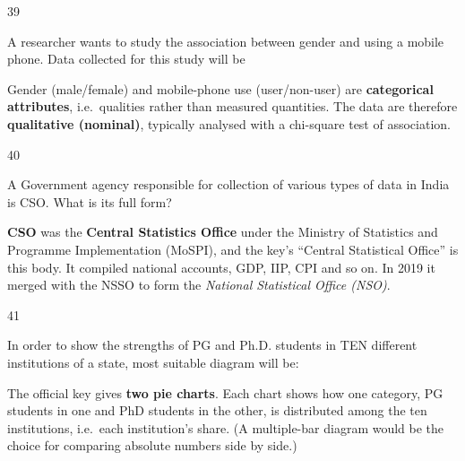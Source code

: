 \begin{question}{39}
{A researcher wants to study the association between gender and using a mobile phone. Data collected for this study will be \blank{}\par}
\begin{explain}
Gender (male/female) and mobile-phone use (user/non-user) are \textbf{categorical attributes}, i.e.\ qualities rather than measured quantities. The data are therefore \textbf{qualitative (nominal)}, typically analysed with a chi-square test of association.
\end{explain}
\end{question}

\begin{question}{40}
{A Government agency responsible for collection of various types of data in India is CSO. What is its full form?\par}
\begin{explain}
\textbf{CSO} was the \textbf{Central Statistics Office} under the Ministry of Statistics and Programme Implementation (MoSPI), and the key's ``Central Statistical Office'' is this body. It compiled national accounts, GDP, IIP, CPI and so on. In 2019 it merged with the NSSO to form the \emph{National Statistical Office (NSO)}.
\end{explain}
\end{question}

\begin{question}{41}
{In order to show the strengths of PG and Ph.D. students in TEN different institutions of a state, most suitable diagram will be:\par}
\begin{explain}
The official key gives \textbf{two pie charts}. Each chart shows how one category, PG students in one and PhD students in the other, is distributed among the ten institutions, i.e.\ each institution's share. (A multiple-bar diagram would be the choice for comparing absolute numbers side by side.)
\end{explain}
\end{question}

